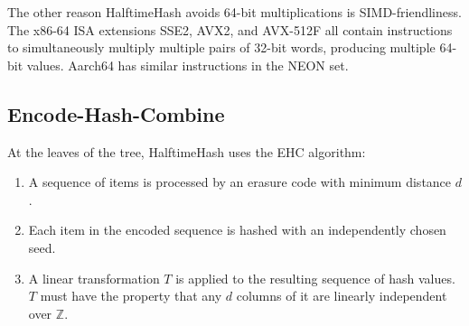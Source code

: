 \documentclass[runningheads]{llncs}
\newcommand{\ints}{\mathbb{Z}}
\begin{document}

The other reason HalftimeHash avoids 64-bit multiplications is SIMD-friend\-li\-ness.
The x86-64 ISA extensions SSE2, AVX2, and AVX-512F all contain instructions to simultaneously multiply multiple pairs of 32-bit words, producing multiple 64-bit values.
Aarch64 has similar instructions in the NEON set.






\subsection{Encode-Hash-Combine}

At the leaves of the tree, HalftimeHash uses the EHC algorithm: \cite{ehc-nandi}

\begin{enumerate}
\item A sequence of items is processed by an erasure code with minimum distance $d$.
\item Each item in the encoded sequence is hashed with an independently chosen seed.
\item A linear transformation $T$ is applied to the resulting sequence of hash values.
  $T$ must have the property that any $d$ columns of it are linearly independent over $\ints$.
\end{enumerate}

\end{document}

